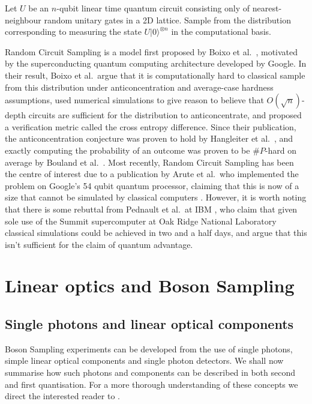 \begin{problem} Let $U$ be an $n$-qubit linear time quantum circuit consisting only of nearest-neighbour random unitary gates in a 2D lattice. Sample from the distribution corresponding to measuring the state $U|0\rangle^{\otimes n}$ in the computational basis.
\end{problem}

Random Circuit Sampling is a model first proposed by Boixo et al.~\cite{boixo2018}, motivated by the superconducting quantum computing architecture developed by Google. In their result, Boixo et al.\ argue that it is computationally hard to classical sample from this distribution under anticoncentration and average-case hardness assumptions, used numerical simulations to give reason to believe that $O(\sqrt{n})$-depth circuits are sufficient for the distribution to anticoncentrate, and proposed a verification metric called the cross entropy difference. Since their publication, the anticoncentration conjecture was proven to hold by Hangleiter et al.~\cite{hangleiter2018}, and exactly computing the probability of an outcome was proven to be $\#P$-hard on average by Bouland et al.~\cite{bouland2018}. Most recently, Random Circuit Sampling has been the centre of interest due to a publication by Arute et al.\ who implemented the problem on Google's 54 qubit quantum processor, claiming that this is now of a size that cannot be simulated by classical computers \cite{arute2019}. However, it is worth noting that there is some rebuttal from Pednault et al.\ at IBM \cite{pednault2019}, who claim that given sole use of the Summit supercomputer at Oak Ridge National Laboratory classical simulations could be achieved in two and a half days, and argue that this isn't sufficient for the claim of quantum advantage.

\section{Linear optics and Boson Sampling}

\subsection{Single photons and linear optical components}

Boson Sampling experiments can be developed from the use of single photons, simple linear optical components and single photon detectors. We shall now summarise how such photons and components can be described in both second and first quantisation. For a more thorough understanding of these concepts we direct the interested reader to \cite{fox2006}.

